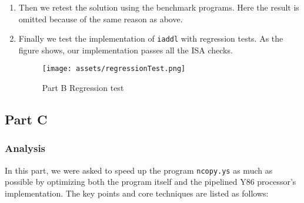 \documentclass{article}
\begin{document}
\begin{enumerate}

  \item Then we retest the solution using the benchmark programs. Here the result is omitted because of the same reason as above.

  \item Finally we test the implementation of \verb|iaddl| with regression tests. As the figure shows, our implementation passes all the ISA checks.
  \begin{figure}[h]
    \centering
    \texttt{[image: assets/regressionTest.png]}
    \caption{Part B Regression test}
  \end{figure}
\end{enumerate}

\subsection{Part C}

\subsubsection{Analysis}

In this part, we were asked to speed up the program \verb|ncopy.ys| as much as possible by optimizing both the program itself and the pipelined Y86 processor's implementation. The key points and core techniques are listed as follows:
\end{document}
